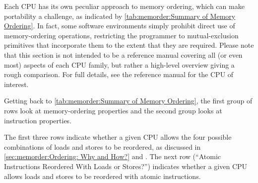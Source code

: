\begin{table}[tbh]
\vspace{5pt}\hfill
{}\OneColumnHSpace{-0.4in}
\caption{Summary of Memory Ordering}
\label{tab:memorder:Summary of Memory Ordering}
\end{table}

Each CPU has its own peculiar approach to memory ordering, which
can make portability a challenge, as indicated by
\cref{tab:memorder:Summary of Memory Ordering}.
In fact, some software environments simply prohibit
direct use of memory-ordering operations, restricting the programmer
to mutual-exclusion primitives that incorporate them to the extent that
they are required.  Please note that this section is not intended to be
a reference manual
covering all (or even most) aspects of each CPU family, but rather
a high-level overview giving a rough comparison.
For full details, see the reference manual for the CPU of interest.

Getting back to
\cref{tab:memorder:Summary of Memory Ordering},
the first group of rows look at memory-ordering
properties and the second group looks at instruction properties.

The first three rows indicate whether a given CPU allows the four
possible combinations of loads and stores to be reordered, as discussed
in
\cref{sec:memorder:Ordering: Why and How?} and
.
The next row (``Atomic Instructions Reordered With Loads or Stores?'')
indicates whether a given CPU allows loads and stores
to be reordered with atomic instructions.

